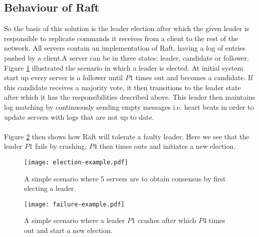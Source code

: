 \subsection{Behaviour of Raft}
So the basis of this solution is the leader election after which the given leader is responsible to replicate commands it receives from a client to the rest of the network. All servers contain an implementation of Raft, having a log of entries pushed by a client.A server can be in three states: leader, candidate or follower. Figure \ref{fig:election_example} illustrated the scenario in which a leader is elected. At initial system start up every server is a follower until $P1$ times out and becomes a candidate. If this candidate receives a majority vote, it then transitions to the leader state after which it has the responsibilities described above. This leader then maintains log matching by continuously sending empty messages i.e. heart beats in order to update servers with logs that are not up to date. \\ \\
Figure \ref{fig:failure_example} then shows how Raft will tolerate a faulty leader. Here we see that the leader $P1$ fails by crashing. $P4$ then times outs and initiates a new election.

\begin{figure}[ht]
\centering
\texttt{[image: election-example.pdf]}
\caption{A simple scenario where 5 servers are to obtain consensus by first electing a leader.}
\label{fig:election_example}
\end{figure}

\begin{figure}[ht]
\centering
\texttt{[image: failure-example.pdf]}
\caption{A simple scenario where a leader $P1$ crashes after which $P4$ times out and start a new election.}
\label{fig:failure_example}
\end{figure}


